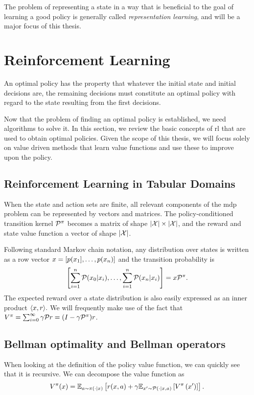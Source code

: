 The problem of representing a state in a way that is beneficial to the goal of learning a good policy is generally called \emph{representation learning}, and will be a major focus of this thesis.


\section{Reinforcement Learning}
\label{chap:background:rl}

\epigraph{An optimal policy has the property that whatever the initial state and initial decisions are, the remaining decisions must constitute an optimal policy with regard to the state resulting from the first decisions.}{\cite{bellman1953}}

Now that the problem of finding an optimal policy is established, we need algorithms to solve it.
In this section, we review the basic concepts of \ac{rl} that are used to obtain optimal policies.
Given the scope of this thesis, we will focus solely on value driven methods that learn value functions and use these to improve upon the policy.

\subsection{Reinforcement Learning in Tabular Domains}

When the state and action sets are finite, all relevant components of the \ac{mdp} problem can be represented by vectors and matrices.
The policy-conditioned transition kernel $\P^\pi$ becomes a matrix of shape $|\X| \times |\X|$, and the reward and state value function a vector of shape $|\X|$.

Following standard Markov chain notation, any distribution over states is written as a row vector $\state = [p(\state_1],\dots, p(\state_n)]$ and the transition probability is $$\left[\sum_{i=1}^n \P(\state_0|\state_i), \dots, \sum_{i=1}^n \P(\state_n|\state_i)\right] = \state \P^\pi.$$
The expected reward over a state distribution is also easily expressed as an inner product $\langle \state,r\rangle.$
We will frequently make use of the fact that $V^\pi = \sum_{i=0}^\infty \gamma \P r = (I - \gamma \P^\pi)r$.

\subsection{Bellman optimality and Bellman operators}

When looking at the definition of the policy value function, we can quickly see that it is recursive.
We can decompose the value function as $$V^\pi(\state) = \mathbb{E}_{a\sim\pi(\cdot|\state)}\left[r(\state,a) + \gamma \mathbb{E}_{\state'\sim\mathcal{P}(\cdot|\state,a)}\left[V^\pi\left(\state'\right)\right]\right].$$


